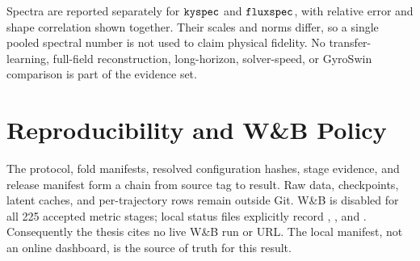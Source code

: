 Spectra are reported separately for $\texttt{kyspec}$ and $\texttt{fluxspec}$, with relative error and
shape correlation shown together. Their scales and norms differ, so a single pooled spectral
number is not used to claim physical fidelity. No transfer-learning, full-field reconstruction,
long-horizon, solver-speed, or GyroSwin comparison is part of the evidence set.

\section{Reproducibility and W\&B Policy}

The protocol, fold manifests, resolved configuration hashes, stage evidence, and release manifest
form a chain from source tag to result. Raw data, checkpoints, latent caches, and per-trajectory
rows remain outside Git. W\&B is disabled for all 225 accepted metric stages; local status files explicitly
record , , and . Consequently the
thesis cites no live W\&B run or URL. The local manifest, not an online dashboard, is the source of
truth for this result.
